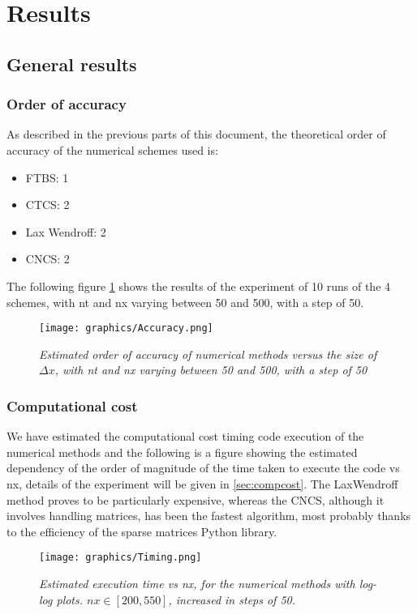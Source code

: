 

\section{Results}

\subsection{General results}

\subsubsection{Order of accuracy}
As described in the previous parts of this document, the theoretical order of accuracy of the numerical schemes used is:
\begin{itemize}
	\item FTBS: 1
	\item CTCS: 2
	\item Lax Wendroff: 2
	\item CNCS: 2
\end{itemize}
The following figure \ref{fig:orderofacc} shows the results of the experiment of 10 runs of the 4 schemes, with nt and nx varying between 50 and 500, with a step of 50.
\begin{figure}[H]
	\begin{center}
		\texttt{[image: graphics/Accuracy.png]}
	\end{center}%
	\caption[Order of accuracy of numerical methods]{ \em Estimated order of accuracy of numerical methods versus the size of $\Delta x$, with nt and nx varying between 50 and 500, with a step of 50}
	\label{fig:orderofacc}
\end{figure}

\subsubsection{Computational cost}
We have estimated the computational cost timing code execution of the numerical methods and the following is a figure showing the estimated dependency of the order of magnitude of the time taken to execute the code vs nx, details of the experiment will be given in \ref{sec:compcost}. The LaxWendroff method proves to be particularly expensive, whereas the CNCS, although it involves handling matrices, has been the fastest algorithm, most probably thanks to the efficiency of the sparse matrices Python library.
\begin{figure}[H]
	\begin{center}
		\texttt{[image: graphics/Timing.png]}
	\end{center}%
	\caption[computational cost of numerical methods]{ \em Estimated execution time vs nx, for the numerical methods with log-log plots.  $nx\in [200, 550]$, increased in steps of 50.}
	\label{fig:timing}
\end{figure}

